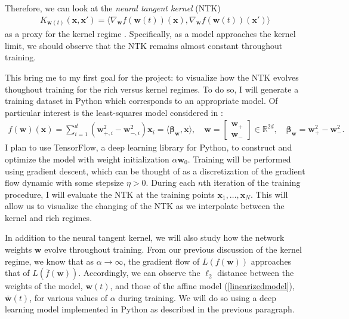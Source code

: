 \documentclass{article}
\begin{document}
Therefore, we can look at the \textit{neural tangent kernel} (NTK)
\begin{align*}
    K_{\boldsymbol{w}(t)}(\boldsymbol{x}, \boldsymbol{x}') = \langle \nabla_{\boldsymbol{w}} f(\boldsymbol{w}(t))(\boldsymbol{x}), \nabla_{\boldsymbol{w}} f(\boldsymbol{w}(t))(\boldsymbol{x}') \rangle
\end{align*}
as a proxy for the kernel regime \cite{jacot2018neural}. Specifically, as a model approaches the kernel limit, we should observe that the NTK remains almost constant throughout training. 

This bring me to my first goal for the project: to visualize how the NTK evolves thoughout training for the rich versus kernel regimes. To do so, I will generate a training dataset in Python which corresponds to an appropriate model. Of particular interest is the least-squares model considered in \cite{woodworth2020kernel}:
\begin{align*}
    f(\boldsymbol{w})(\boldsymbol{x}) = \sum_{i=1}^d (\boldsymbol{w}_{+, i}^2 - \boldsymbol{w}_{-, i}^2)\boldsymbol{x}_i = \langle \boldsymbol{\beta}_{\boldsymbol{w}}, \boldsymbol{x} \rangle, \quad \boldsymbol{w} = \begin{bmatrix}
                        \boldsymbol{w}_+ \\
                        \boldsymbol{w}_-
                        \end{bmatrix} \in \mathbb{R}^{2d},
    \quad \boldsymbol{\beta}_{\boldsymbol{w}} = \boldsymbol{w}_+^2 - \boldsymbol{w}_-^2.
\end{align*}
I plan to use TensorFlow, a deep learning library for Python, to construct and optimize the model with weight initialization $\alpha \boldsymbol{w}_0$. Training will be performed using gradient descent, which can be thought of as a discretization of the gradient flow dynamic with some stepsize $\eta > 0$. During each $n$th iteration of the training procedure, I will evaluate the NTK at the training points $\boldsymbol{x}_1, \ldots, \boldsymbol{x}_N$. This will allow us to visualize the changing of the NTK as we interpolate between the kernel and rich regimes.

In addition to the neural tangent kernel, we will also study how the network weights $\boldsymbol{w}$ evolve throughout training. From our previous discussion of the kernel regime, we know that as $\alpha \rightarrow \infty$, the gradient flow of $L(f(\boldsymbol{w}))$ approaches that of $L(\bar{f}(\boldsymbol{w}))$. Accordingly, we can observe the $\ell_2$ distance between the weights of the model, $\boldsymbol{w}(t)$, and those of the affine model (\ref{linearizedmodel}), $\bar{\boldsymbol{w}}(t)$, for various values of $\alpha$ during training. We will do so using a deep learning model implemented in Python as described in the previous paragraph.
\end{document}
